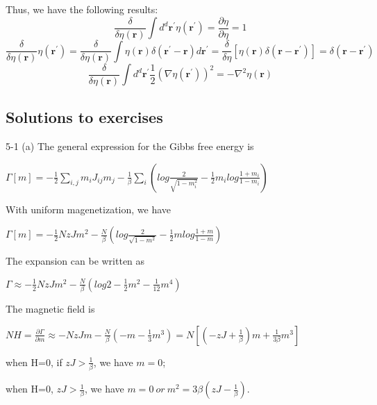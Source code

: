 \documentclass[12pt,titlepage]{article}
\numberwithin{equation}{section}
\begin{document}
Thus, we have the following results:
\begin{equation}
\frac{\delta}{\delta \eta(\mathbf{r})} \int d^{d} \mathbf{r}^{\prime} \eta\left(\mathbf{r}^{\prime}\right)=\frac{\partial\eta}{\partial\eta}=1
\end{equation}
\begin{equation}
\frac{\delta}{\delta \eta(\mathbf{r})} \eta\left(\mathbf{r}^{\prime}\right)=\frac{\delta}{\delta \eta(\mathbf{r})}\int\eta(\mathbf{r})\delta(\mathbf{r}^{\prime}-\mathbf{r})d\mathbf{r}^{\prime}=\frac{\delta}{\delta\eta}[\eta(\mathbf{r})\delta(\mathbf{r}-\mathbf{r}^{\prime})]=\delta\left(\mathbf{r}-\mathbf{r}^{\prime}\right)
\end{equation}
\begin{equation}
\frac{\delta}{\delta \eta(\mathbf{r})} \int d^{d} \mathbf{r}^{\prime} \frac{1}{2}\left(\nabla \eta\left(\mathbf{r}^{\prime}\right)\right)^{2}=-\nabla^{2} \eta(\mathbf{r})
\end{equation}

\subsection{Solutions to exercises}
5-1 (a) The general expression for the Gibbs free energy is 

$\displaystyle \Gamma [ m] =-\frac{1}{2}\sum _{i,j} m_{i} J_{ij} m_{j} -\frac{1}{\beta }\sum _{i}\left( log\frac{2}{\sqrt{1-m^{2}_{i}}} -\frac{1}{2} m_{i} log\frac{1+m_{i}}{1-m_{i}}\right)$

With uniform magenetization, we have 

$\displaystyle \Gamma [ m] =-\frac{1}{2} NzJm^{2} -\frac{N}{\beta }\left( log\frac{2}{\sqrt{1-m^{2}}} -\frac{1}{2} mlog\frac{1+m}{1-m}\right)$

The expansion can be written as

$\displaystyle \Gamma \approx -\frac{1}{2} NzJm^{2} -\frac{N}{\beta }\left( log2-\frac{1}{2} m^{2} -\frac{1}{12} m^{4}\right)$

The magnetic field is

$\displaystyle NH=\frac{\partial \Gamma }{\partial m} \approx -NzJm-\frac{N}{\beta }\left( -m-\frac{1}{3} m^{3}\right) =N\left[\left( -zJ+\frac{1}{\beta }\right) m+\frac{1}{3\beta } m^{3}\right]$

when H=0, if $\displaystyle zJ >\frac{1}{\beta }$, we have $\displaystyle m=0$;

when H=0, $\displaystyle zJ >\frac{1}{\beta }$, we have $\displaystyle m=0\ or\ m^{2} =3\beta \left( zJ-\frac{1}{\beta }\right)$.
\end{document}
